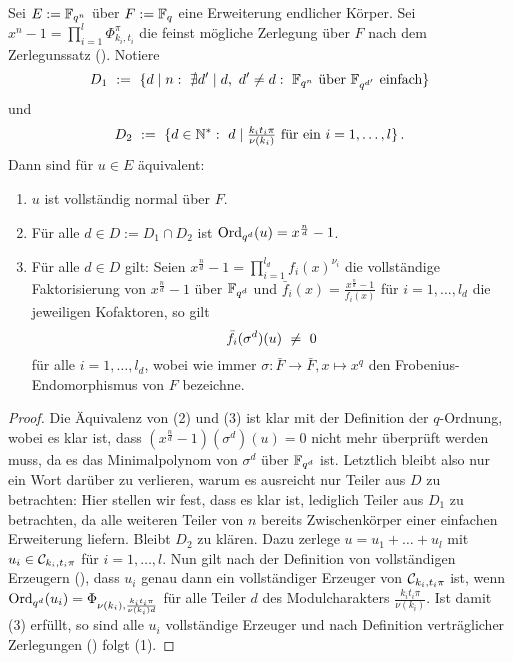 \begin{lemma}
  Sei $E := \mathbb{F}_{q^n}$ über $F := \mathbb{F}_q$ eine Erweiterung endlicher Körper.
  Sei $x^n-1 = \prod_{i=1}^l \Phi_{k_i,t_i}^\pi$
  die feinst mögliche Zerlegung über $F$ nach 
  dem Zerlegunssatz ().
  Notiere
  \[ D_1 \speq{:=} \{ d\mid n:\ 
    \nexists d'\mid d,\ d'\neq d:\ \F_{q^n} \text{ über } \F_{q^{d'}}
    \text{ einfach} \}\]
  und 
  \[ D_2 \ :=\  \{ d\in \mathbb{N}^\ast:\ d \mid \tfrac{k_it_i\pi}{\nu(k_i)}
    \text{ für ein } i=1,\ldots,l\}\,.\]
  Dann sind für $u\in E$ äquivalent:
  \begin{enumerate}
    \item $u$ ist vollständig normal über $F$.
    \item Für alle $d \in D := D_1 \cap D_2$ ist
      $\operatorname{Ord}_{q^d}(u) = x^{\frac n d}-1$.
    \item Für alle $d\in D$ gilt:
      Seien $x^{\frac n d}-1 = \prod_{i=1}^{l_d} f_i(x)^{\nu_i}$ 
      die vollständige Faktorisierung  von $x^{\frac n d}-1$ 
      über $\mathbb{F}_{q^d}$ und 
      $\bar f_i(x) = \tfrac{x^{\frac n d}-1}{f_i(x)}$ 
      für $i=1,\ldots,l_d$ die jeweiligen
      Kofaktoren, so gilt
      \[ \bar f_i(\sigma^d)(u) \ \neq\  0 \]
      für alle $i=1,\ldots,l_d$, wobei wie immer 
      $\sigma: \bar F \to \bar F, x\mapsto x^q$ den Frobenius-Endomorphismus
      von $F$ bezeichne.
  \end{enumerate}
\end{lemma}
\begin{proof}
  Die Äquivalenz von (2) und (3) ist klar mit der Definition der $q$-Ordnung,
  wobei es klar ist, dass $(x^{\frac n d}-1)(\sigma^d)(u) = 0$ nicht mehr
  überprüft werden muss, da es das Minimalpolynom von $\sigma^d$ über 
  $\mathbb{F}_{q^d}$ ist.
  Letztlich bleibt also nur ein Wort darüber zu verlieren, warum es ausreicht
  nur Teiler aus $D$ zu betrachten: Hier stellen wir fest, dass es klar ist,
  lediglich Teiler aus $D_1$ zu betrachten, da alle weiteren Teiler von $n$
  bereits Zwischenkörper einer einfachen Erweiterung liefern.
  Bleibt $D_2$ zu klären. Dazu zerlege $u = u_1+\ldots+u_l$ mit
  $u_i \in \mathcal{C}_{k_i,t_i\pi}$ für $i=1,\ldots,l$. Nun gilt
  nach der Definition von vollständigen Erzeugern
  (), dass
  $u_i$ genau dann ein vollständiger Erzeuger von $\mathcal{C}_{k_i,t_i\pi}$ ist,
  wenn $\operatorname{Ord}_{q^d}(u_i) = \Phi_{\nu(k_i),\frac{k_it_i\pi}{\nu(k_i)d}}$ für alle
  Teiler $d$ des Modulcharakters $\frac{k_it_i\pi}{\nu(k_i)}$.
  Ist damit (3) erfüllt, so sind alle $u_i$ vollständige Erzeuger und nach
  Definition verträglicher Zerlegungen (\thref{def:vertraeglich}) folgt
  (1).
\end{proof}


